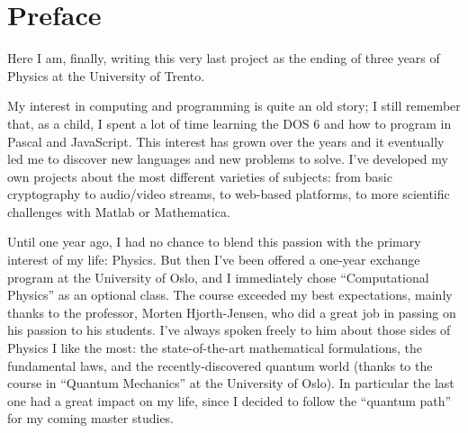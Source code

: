 
\chapter{Preface}

Here I am, finally, writing this very last project as the ending of three years of Physics at the University of Trento.

My interest in computing and programming is quite an old story; I still remember that, as a child, I spent a lot of time learning the DOS 6 and how to program in Pascal and JavaScript. This interest has grown over the years and it eventually led me to discover new languages and new problems to solve. I've developed my own projects about the most different varieties of subjects: from basic cryptography to audio/video streams, to web-based platforms, to more scientific challenges with Matlab or Mathematica.

Until one year ago, I had no chance to blend this passion with the primary interest of my life: Physics. But then I've been offered a one-year exchange program at the University of Oslo, and I immediately chose ``Computational Physics'' as an optional class. The course exceeded my best expectations, mainly thanks to the professor, Morten Hjorth-Jensen, who did a great job in passing on his passion to his students. I've always spoken freely to him about those sides of Physics I like the most: the state-of-the-art mathematical formulations, the fundamental laws, and the recently-discovered quantum world (thanks to the course in ``Quantum Mechanics'' at the University of Oslo). In particular the last one had a great impact on my life, since I decided to follow the ``quantum path'' for my coming master studies.

